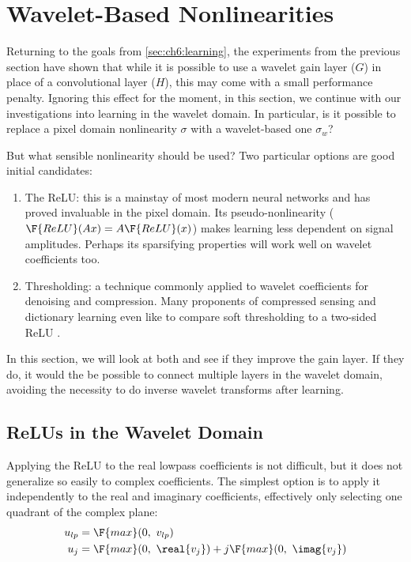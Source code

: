 \section{Wavelet-Based Nonlinearities}\label{sec:ch6:nonlinearities}
Returning to the goals from \autoref{sec:ch6:learning}, the experiments from the
previous section have shown that while it is possible to use a wavelet gain
layer ($G$) in place of a convolutional layer ($H$), this may come with a small
performance penalty. Ignoring this effect for the moment, in this section, we
continue with our investigations into learning in the wavelet domain. In
particular, is it possible to replace a pixel domain nonlinearity $\sigma$ with
a wavelet-based one $\sigma_w$?

But what sensible nonlinearity should be used? Two particular options are good initial
candidates:
\begin{enumerate}
  \item The ReLU: this is a mainstay of most modern neural networks and has
    proved invaluable in the pixel domain. Its pseudo-nonlinearity
    ($\F{ReLU}(Ax) = A\F{ReLU}(x)$) makes learning less dependent on signal
    amplitudes. Perhaps its sparsifying
    properties will work well on wavelet coefficients too. 
  \item Thresholding: a technique commonly applied to wavelet
    coefficients for denoising and compression. Many proponents of compressed
    sensing and dictionary learning even like to compare soft thresholding to a
    two-sided ReLU \cite{papyan_theoretical_2018, papyan_convolutional_2017-1}.
\end{enumerate}

In this section, we will look at both and see if they improve the gain
layer. If they do, it would the be possible to connect multiple layers in the
wavelet domain, avoiding the necessity to do inverse wavelet transforms after
learning.

\subsection{ReLUs in the Wavelet Domain}
Applying the ReLU to the real lowpass coefficients is not difficult, but it does
not generalize so easily to complex coefficients. The simplest option is to apply
it independently to the real and imaginary coefficients, effectively only
selecting one quadrant of the complex plane:
\begin{align}
  u_{lp} &= \F{max}(0,\ v_{lp}) \\
  u_{j} &= \F{max}(0,\ \real{v_{j}}) + j\F{max}(0,\ \imag{v_j}) \label{eq:ch6:relu_bp}
\end{align}

